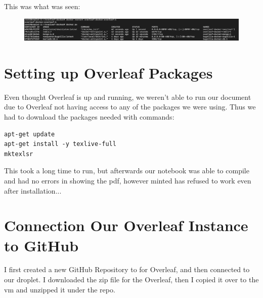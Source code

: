 This was what was seen:
\begin{figure}
    \centering
    \includegraphics[width=1.0\linewidth]{png/finally_fixed.png}
\end{figure}

\section{Setting up Overleaf Packages}
Even thought Overleaf is up and running, we weren't able to run our document due to Overleaf not having access to any of the packages we were using. Thus we had to download the packages needed with commands:
\begin{verbatim}
apt-get update
apt-get install -y texlive-full
mktexlsr
\end{verbatim}
This took a long time to run, but afterwards our notebook was able to compile and had no errors in showing the pdf, however minted has refused to work even after installation...

\section{Connection Our Overleaf Instance to GitHub}
I first created a new GitHub Repository to for Overleaf, and then connected to our droplet. I downloaded the zip file for the Overleaf, then I copied it over to the vm and unzipped it under the repo. 



